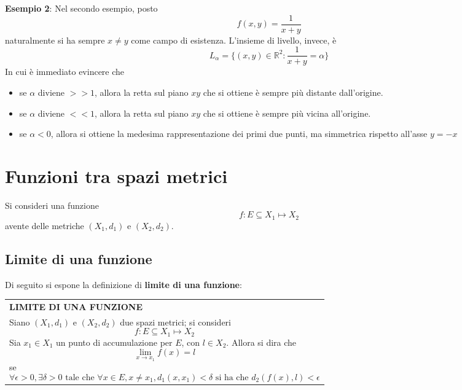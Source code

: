 \documentclass[a4paper]{extarticle}
\renewcommand\arraystretch{}
\begin{document}
\vspace{2em}
\noindent
\textbf{Esempio 2}: Nel secondo esempio, posto
\[f(x,y)=\frac{1}{x+y}\]
naturalmente si ha sempre $x \neq y$ come campo di esistenza. L'insieme di livello, invece, è
\[L_\alpha = \{(x,y) \in \mathbb{R}^2 : \frac{1}{x+y}=\alpha\}\]
In cui è immediato evincere che
\begin{itemize}
    \item se $\alpha$ diviene $>>1$, allora la retta sul piano $xy$ che si ottiene è sempre più distante dall'origine.
    \item se $\alpha$ diviene $<<1$, allora la retta sul piano $xy$ che si ottiene è sempre più vicina all'origine.
    \item se $\alpha<0$, allora si ottiene la medesima rappresentazione dei primi due punti, ma simmetrica rispetto all'asse $y=-x$ 
\end{itemize}

\newpage
\section{Funzioni tra spazi metrici}
Si consideri una funzione
\[f : E \subseteq X_1 \longmapsto X_2\]
avente delle metriche $(X_1,d_1)$ e $(X_2,d_2)$.

\vspace{1em}
\noindent
\subsection{Limite di una funzione}
Di seguito si espone la definizione di \textbf{limite di una funzione}:

\vspace{1em}
\setlength{\tabcolsep}{14pt}
\renewcommand{\arraystretch}{2}
\noindent
\begin{tabularx}{\textwidth}{@{}|P|@{}}
    \hline
    {\textbf{LIMITE DI UNA FUNZIONE}}\\
    \parbox{\linewidth}{Siano $(X_1,d_1)$ e $(X_2,d_2)$ due spazi metrici; si consideri
    \[f : E \subseteq X_1 \longmapsto X_2\]
    Sia $x_1 \in X_1$ un punto di accumulazione per $E$, con $l \in X_2$. Allora si dira che
    \[\lim_{x \to x_1} f(x) = l\]
    se
    \[\forall \epsilon>0, \exists \delta>0 \text{ tale che } \forall x \in E, x \neq x_1, d_1(x,x_1) < \delta \text{ si ha che } d_2(f(x),l) < \epsilon\]
    \vspace{-1mm}}\\
    \hline
\end{tabularx}
\end{document}

